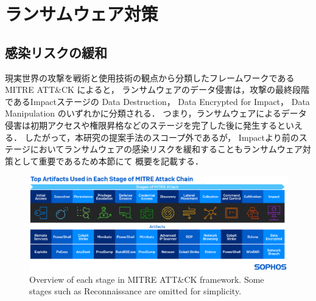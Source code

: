 \chapter{ランサムウェア対策}
\section{感染リスクの緩和}
現実世界の攻撃を戦術と使用技術の観点から分類したフレームワークであるMITRE ATT\&CK \cite{MITREATT12:online}によると，
ランサムウェアのデータ侵害は，攻撃の最終段階であるImpactステージの
Data Destruction，
Data Encrypted for Impact，
Data Manipulation
のいずれかに分類される．
つまり，ランサムウェアによるデータ侵害は初期アクセスや権限昇格などのステージを完了した後に発生するといえる．
したがって，本研究の提案手法のスコープ外であるが，
Impactより前のステージにおいてランサムウェアの感染リスクを緩和することもランサムウェア対策として重要であるため本節にて
概要を記載する．
\begin{figure}[t]
  \begin{center}
    \includegraphics[width=\columnwidth]{doc/img/mitre-attack-chain.eps}
  \end{center}
  \caption{Overview of each stage in MITRE ATT\&CK framework.
    Some stages such as Reconnaissance are omitted for simplicity. \cite{mitre-explained}}
  \label{fig:mitre-attack-chain}
\end{figure}



